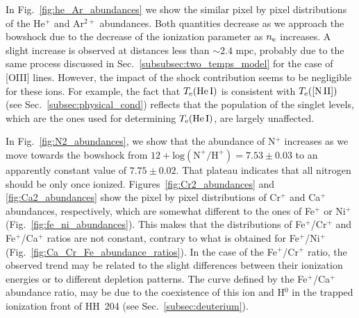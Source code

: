 \documentclass[twocolumn]{aastex63}
\newcommand{\cesar}[1]{{\color{red}C: #1}}
\begin{document}
In Fig.~\ref{fig:he_Ar_abundances} we show the similar pixel by pixel distributions of the He$^{+}$ and Ar$^{2+}$ abundances. Both quantities decrease as we approach the bowshock due to the decrease of the ionization parameter as $n_{\rm e}$ increases. A slight increase is observed at distances less than $\sim 2.4  \text{ mpc}$, probably due to the same process discussed in Sec.~\ref{subsubsec:two_temps_model} for the case of [O\thinspace III] lines. However, the impact of the shock contribution seems to be negligible for these ions. For example, the fact that $T_{\rm e}(\text{He\thinspace I})$ is consistent with $T_{\rm e}(\text{[N\thinspace II]})$ (see Sec.~\ref{subsec:physical_cond}) reflects that the population of the singlet levels, which are the ones used for determining $T_{\rm e}(\text{He\thinspace I})$, are largely unaffected.


In Fig.~\ref{fig:N2_abundances}, we show that the abundance of N$^+$ increases as we move towards the bowshock from $12+\text{log}(\text{N}^{+}/\text{H}^{+})=7.53\pm 0.03$ to an apparently constant value of $7.75\pm 0.02$. That plateau indicates that all nitrogen should be only once ionized. Figures~\ref{fig:Cr2_abundances} and \ref{fig:Ca2_abundances} show the pixel by pixel distributions of Cr$^+$ and Ca$^{+}$ abundances, respectively, which are somewhat different to the ones of Fe$^{+}$ or Ni$^{+}$ (Fig.~\ref{fig:fe_ni_abundances}). This makes that the distributions of  Fe$^{+}$/Cr$^{+}$ and Fe$^{+}$/Ca$^{+}$ ratios are not constant, contrary to what is obtained for Fe$^{+}$/Ni$^{+}$ (Fig.~\ref{fig:Ca_Cr_Fe_abundance_ratios}). In the case of the Fe$^{+}$/Cr$^{+}$ ratio, the observed trend may be related to the slight differences between their ionization energies or to different depletion patterns. The curve defined by the Fe$^{+}$/Ca$^{+}$ abundance ratio, may be due to the coexistence of this ion and H$^{0}$ in the trapped ionization front of HH~204 (see Sec.~\ref{subsec:deuterium}). 


\end{document}
